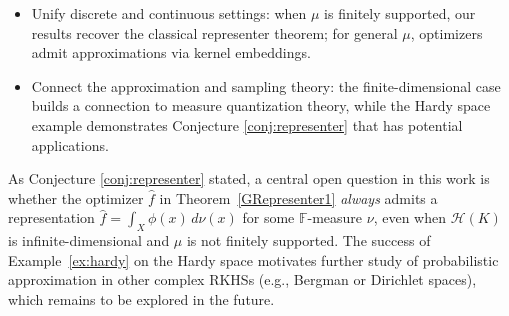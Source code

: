 \documentclass{amsart}
\numberwithin{equation}{section}
\theoremstyle{plain}
\theoremstyle{remark}
\theoremstyle{definition}
\begin{document}
\begin{itemize}
    \item Unify discrete and continuous settings: when $\mu$ is finitely supported, our results recover the classical representer theorem; for general $\mu$, optimizers admit approximations via kernel embeddings. %
    \item Connect the approximation and sampling theory: the finite-dimensional case builds a connection to measure quantization theory, while the Hardy space example demonstrates Conjecture \ref{conj:representer} that has potential applications.  
\end{itemize}

As Conjecture \ref{conj:representer} stated, a central open question in this work is whether the optimizer $\hat{f}$ in Theorem~\ref{GRepresenter1} \emph{always} admits a representation $\hat{f} = \int_X \phi(x) \, d\nu(x)$ for some $\mathbb{F}$-measure $\nu$, even when $\mathscr{H}(K)$ is infinite-dimensional and $\mu$ is not finitely supported. The success of Example~\ref{ex:hardy} on the Hardy space motivates further study of probabilistic approximation in other complex RKHSs (e.g., Bergman or Dirichlet spaces), which remains to be explored in the future. 

\vspace{0.5cm}
\end{document}
